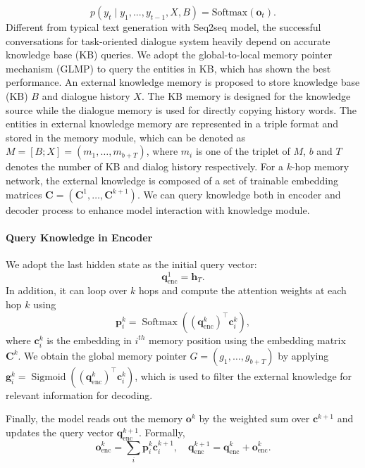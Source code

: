 \documentclass[11pt,a4paper]{article}
\begin{document}
\begin{equation} \label{generation}
	p(y_t \mid y_1, ..., y_{t-1}, {X}, B) = \text{Softmax}(\boldsymbol{o}_t).
\end{equation}
Different from typical text generation with Seq2seq model, the successful conversations for task-oriented dialogue system heavily depend on accurate knowledge base (KB) queries.
We adopt the global-to-local memory pointer mechanism (GLMP) \cite{DBLP:conf/iclr/WuSX19} to query the entities in KB, which has shown the best performance. 
An external knowledge memory is proposed to store  knowledge base (KB) $B$ and dialogue history $X$.
The KB memory is designed for the knowledge source while the dialogue memory is used for directly copying history words.
The entities in external knowledge memory are represented in a triple format and stored in the memory module, which can be denoted as $M = [B; X] = (m_1,\dots,m_{b+T})$, where $m_i$ is one of the triplet of $M$, $b$ and $T$ denotes the number of KB and dialog history respectively.
For a $k$-hop memory network, the external knowledge is composed of a set of trainable embedding matrices $\boldsymbol{C} = (\boldsymbol{C}^1,\dots,\boldsymbol{C}^{k+1})$.
We can query knowledge both in encoder and decoder process to enhance model interaction with knowledge module.


\paragraph{Query Knowledge in Encoder} \label{encoder_query}
We adopt the last hidden state as the initial query vector:
\begin{equation}
\label{initial}
\boldsymbol{q}_\text{enc}^{1} = \boldsymbol{h}_{T}.
\end{equation}
In addition, it can loop over $k$ hops and compute the attention weights at each hop $k$ using
\begin{equation}
\boldsymbol{p}^k_i = \operatorname{Softmax}((\boldsymbol{q}_\text{enc}^k)^\top  \boldsymbol{c}^k_i),
\label{attn_eq}
\end{equation}
where $\boldsymbol{c}^k_i $ is the embedding in $i^{th}$ memory position using the embedding matrix $\boldsymbol{C}^k$.
We obtain the global memory pointer $G = (g_1,\dots,g_{b+T})$ by applying $\boldsymbol{g}^k_i = \operatorname{Sigmoid}((\boldsymbol{q}_\text{enc}^k)^\top \boldsymbol{c}^k_i)$, which is used to filter the external knowledge for relevant information for decoding.

Finally, the model reads out the memory $\boldsymbol{o}^k$ by the weighted sum over $\boldsymbol{c}^{k+1}$ and updates the query vector $\boldsymbol{q}_\text{enc}^{k+1}$. Formally,
\begin{equation}
\boldsymbol{o}_\text{enc}^k = \sum_i \boldsymbol{p}^k_i \boldsymbol{c}^{k+1}_i, \quad \boldsymbol{q}_\text{enc}^{k+1} = \boldsymbol{q}_\text{enc}^{k} + \boldsymbol{o}_\text{enc}^{k}.
\end{equation}
\end{document}
